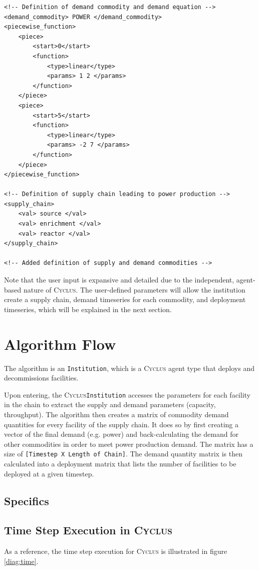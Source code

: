 \documentclass[11pt,letterpaper]{article}
\newcommand{\Cyclus}{\textsc{Cyclus}\xspace}%
\begin{document}
\begin{verbatim}
<!-- Definition of demand commodity and demand equation -->
<demand_commodity> POWER </demand_commodity>
<piecewise_function>
	<piece>
		<start>0</start>
		<function>
			<type>linear</type>
			<params> 1 2 </params>
		</function>
	</piece>
	<piece>
		<start>5</start>
		<function>
			<type>linear</type>
			<params> -2 7 </params>
		</function>
	</piece>
</piecewise_function>

<!-- Definition of supply chain leading to power production -->
<supply_chain>
	<val> source </val>
	<val> enrichment </val>
	<val> reactor </val>
</supply_chain>

<!-- Added definition of supply and demand commodities -->
\end{verbatim}

Note that the user input is expansive and detailed due to the 
independent, agent-based nature of \Cyclus. The user-defined
parameters will allow the institution create a supply chain,
demand timeseries for each commodity, and deployment timeseries,
which will be explained in the next section.

\section{Algorithm Flow}

The algorithm is an \texttt{Institution}, which is a \Cyclus agent type
that deploys and decommissions facilities.

Upon entering, the \Cyclus \texttt{Institution} accesses the parameters for each
facility in the chain to extract the supply and demand parameters (capacity, throughput).
The algorithm then creates a matrix of commodity demand quantities for every
facility of the supply chain. It does so by first creating a vector
of the final demand (e.g. power) and back-calculating the demand for other
commodities in order to meet power production demand.
The matrix has a size of \texttt{[Timestep X Length of Chain]}.
The demand quantity matrix is then calculated into a deployment matrix that
lists the number of facilities to be deployed at a given timestep.


\subsection{Specifics}


\subsection{Time Step Execution in \Cyclus}
As a reference, the time step execution for \Cyclus is illustrated in figure \ref{diag:time}.
\end{document}
